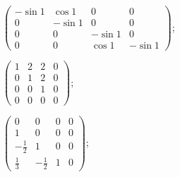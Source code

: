 \begin{enumsols}
		\label{sol:linsys_funcs:matrixA}
		\item \( \begin{pmatrix} -\sin{1} & \cos{1} & 0 & 0 \\ 0 & -\sin{1} & 0 & 0 \\ 0 & 0 & -\sin{1} & 0 \\ 0 & 0 & \cos{1} & -\sin{1} \end{pmatrix} \); %
		\item \( \begin{pmatrix} 1 & 2 & 2 & 0 \\ 0 & 1 & 2 & 0 \\ 0 & 0 & 1 & 0 \\ 0 & 0 & 0 & 0 \end{pmatrix} \); %
		\item \( \begin{pmatrix} 0 & 0 & 0 & 0 \\ 1 & 0 & 0 & 0 \\ -\frac{1}{2} & 1 & 0 & 0 \\ \frac{1}{3} & -\frac{1}{2} & 1 & 0 \end{pmatrix} \); %
	
	\end{enumsols}

